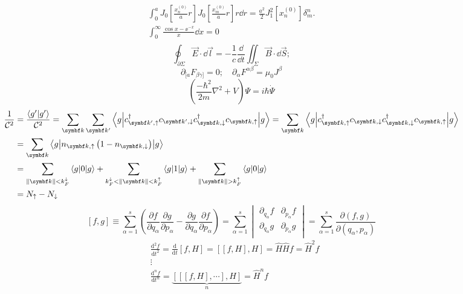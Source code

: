 \documentclass { article }
\begin{document}
\begin{align*}
\int_{0}^aJ_0\left[\frac{x_n^{(0)}}{a}r\right]J_0\left[\frac{x_m^{(0)}}{a}r\right]r\dd{r}=\frac{a^2}{2}J_1^2[x_n^{(0)}]\delta_m^n.\\
\int_{0}^{\infty}\frac{\cos x-\ee^{-x}}{x}\dd{x}=0\\
\end{align*}
\[\oint_{\partial\Sigma}\vec E\cdot \dd{\vec{l}}=-\frac{1}{c}\frac{\dd}{\dd t}\iint_{\Sigma}\vec B \cdot \dd{\vec{S}};\]
\[\partial_{[a}F_{\beta\gamma]}=0;\quad \partial_\alpha F^{\alpha\beta}=\mu_0J^\beta\]
\[\left(\frac{-\hbar^2}{2m}\nabla^2+V\right)\Psi=i\hbar\dot{\Psi}\]
\[\begin{split}
\frac{1}{\mathcal{C}^2}&{}=\frac{\innerprod{g'}{g'}}{\mathcal{C}^2}=\sum_{\bm{k}}\sum_{\bm{k}'}\brakket{g}{c_{\bm{k}',\uparrow}^\dagger c_{\bm{k}',\downarrow} c_{\bm{k},\downarrow}^\dagger c_{\bm{k},\uparrow}}{g}=\sum_{\bm{k}}\brakket{g}{c_{\bm{k},\uparrow}^\dagger c_{\bm{k},\downarrow} c_{\bm{k},\downarrow}^\dagger c_{\bm{k},\uparrow}}{g}\\
&{}=\sum_{\bm{k}}\brakket{g}{n_{\bm{k},\uparrow}\left(1-n_{\bm{k},\downarrow}\right)}{g}\\
&{}=\sum_{\norm{\bm{k}}<k_F^\downarrow}\brakket{g}{0}{g}+\sum_{k_F^\downarrow<\norm{\bm{k}}<k_F^\uparrow}\brakket{g}{1}{g}+\sum_{\norm{\bm{k}}>k_F^\uparrow}\brakket{g}{0}{g}\\
&{}=N_\uparrow-N_\downarrow
\end{split}\]
\[\left[ f,g \right]\equiv \sum_{\alpha =1}^{s}{\left( \frac{\partial f}{\partial {{q}_{\alpha }}}\frac{\partial g}{\partial {{p}_{\alpha }}}-\frac{\partial g}{\partial {{q}_{\alpha }}}\frac{\partial f}{\partial {{p}_{\alpha }}} \right)}=\sum\limits_{\alpha =1}^{s}{\begin{vmatrix}
	\partial_{{q}_{\alpha }} f & \partial_{{p}_{\alpha }} f  \\
	\partial_{{q}_{\alpha }} g & \partial_{{p}_{\alpha }} g  \\
	\end{vmatrix} }=\sum\limits_{\alpha =1}^{s}{\frac{\partial \left( f,g \right)}{\partial \left( {{q}_{\alpha }},{{p}_{\alpha }} \right)}}\]
\[\begin{split}
& \frac{{{\text{d}}^{2}}f}{\text{d}{{t}^{2}}}=\frac{\text{d}}{\text{d}t}\left[ f,H \right]=\left[ \left[ f,H \right],H \right]=\hat{H}\hat{H}f={{{\hat{H}}}^{2}}f \\ 
& \vdots  \\ 
& \frac{{{\text{d}}^{n}}f}{\text{d}{{t}^{n}}}=\underbrace{\left[ \left[ \left[ f,H \right],\cdots  \right],H \right]}_{n}={{{\hat{H}}}^{n}}f  \\
\end{split}\]
\end{document}
